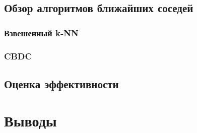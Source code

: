 \subsection{Обзор алгоритмов ближайших соседей}
\subsubsection{Взвешенный k-NN}
\subsubsection{CBDC}
\subsection{Оценка эффективности}
\section{Выводы}






